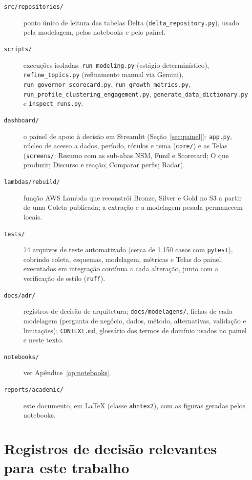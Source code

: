 \begin{description}
    \item[\texttt{src/repositories/}] ponto único de leitura das tabelas Delta (\texttt{delta\_\allowbreak{}repository.py}), usado pela modelagem, pelos notebooks e pelo painel.
    \item[\texttt{scripts/}] execuções isoladas: \texttt{run\_\allowbreak{}modeling.py} (estágio determinístico), \texttt{refine\_\allowbreak{}topics.py} (refinamento manual via Gemini), \texttt{run\_\allowbreak{}governor\_\allowbreak{}scorecard.py}, \texttt{run\_\allowbreak{}growth\_\allowbreak{}metrics.py}, \texttt{run\_\allowbreak{}profile\_\allowbreak{}clustering\_\allowbreak{}engagement.py}, \texttt{generate\_\allowbreak{}data\_\allowbreak{}dictionary.py} e \texttt{inspect\_\allowbreak{}runs.py}.
    \item[\texttt{dashboard/}] o painel de apoio à decisão em Streamlit (Seção~\ref{sec:painel}): \texttt{app.py}, núcleo de acesso a dados, período, rótulos e tema (\texttt{core/}) e as Telas (\texttt{screens/}: Resumo com as sub-abas NSM, Funil e Scorecard; O que produzir; Discurso e reação; Comparar perfis; Radar).
    \item[\texttt{lambdas/rebuild/}] função AWS Lambda que reconstrói Bronze, Silver e Gold no S3 a partir de uma Coleta publicada; a extração e a modelagem pesada permanecem locais.
    \item[\texttt{tests/}] 74 arquivos de teste automatizado (cerca de 1.150 casos com \texttt{pytest}), cobrindo coleta, esquemas, modelagem, métricas e Telas do painel; executados em integração contínua a cada alteração, junto com a verificação de estilo (\texttt{ruff}).
    \item[\texttt{docs/adr/}] registros de decisão de arquitetura; \texttt{docs/modelagens/}, fichas de cada modelagem (pergunta de negócio, dados, método, alternativas, validação e limitações); \texttt{CONTEXT.md}, glossário dos termos de domínio usados no painel e neste texto.
    \item[\texttt{notebooks/}] ver Apêndice~\ref{ap:notebooks}.
    \item[\texttt{reports/academic/}] este documento, em \LaTeX{} (classe \texttt{abntex2}), com as figuras geradas pelos notebooks.
\end{description}

\section*{Registros de decisão relevantes para este trabalho}

